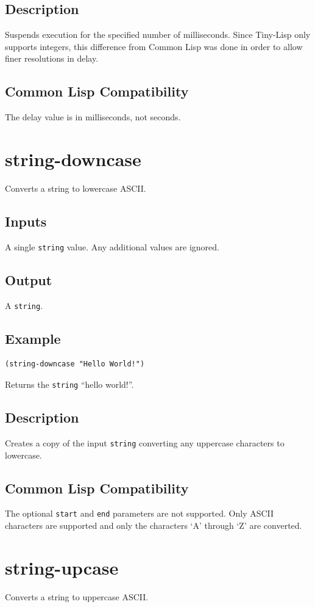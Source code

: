 \documentclass[10pt, openany]{book}
\newcommand{\keyword}[1]{\texttt{#1}}
\newcommand{\datatype}[1]{\texttt{#1}}
\newcommand{\tl}{Tiny-Lisp}
\newcommand{\cl}{Common Lisp}
\begin{document}
\subsection{Description}
Suspends execution for the specified number of milliseconds.  Since \tl{} only supports integers, this difference from \cl{} was done in order to allow finer resolutions in delay.
\subsection{Common Lisp Compatibility}
The delay value is in milliseconds, not seconds.

\section{string-downcase}
Converts a string to lowercase ASCII.
\subsection{Inputs}
A single \datatype{string} value.  Any additional values are ignored.
\subsection{Output}
A \datatype{string}.
\subsection{Example}
\begin{lstlisting}
(string-downcase "Hello World!")
\end{lstlisting}
Returns the \datatype{string} ``hello world!''.
\subsection{Description}
Creates a copy of the input \datatype{string} converting any uppercase characters to lowercase.
\subsection{Common Lisp Compatibility}
The optional \keyword{start} and \keyword{end} parameters are not supported.  Only ASCII characters are supported and only the characters `A' through `Z' are converted.

\section{string-upcase}
Converts a string to uppercase ASCII.
\end{document}
